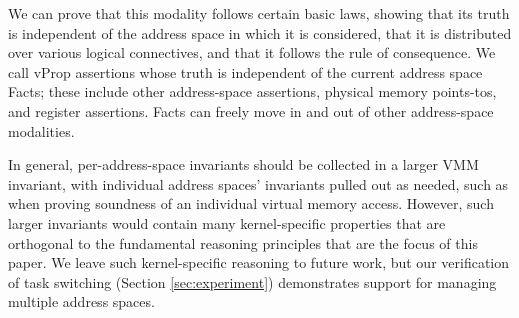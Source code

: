 We can prove that this modality follows certain basic laws, showing that its truth is independent of the address
space in which it is considered, that it is distributed over various logical connectives, and that it follows the rule of
consequence.
We call \textsf{vProp} assertions whose truth is independent of the current address space
\textsf{Fact}s; these include other address-space assertions, physical memory points-tos, and register assertions.
\textsf{Fact}s can freely move in and out of other address-space modalities.

In general, per-address-space invariants should be collected in a larger
VMM invariant, with individual address spaces' invariants pulled out as needed, such as when proving
soundness of an individual virtual memory access.
However, such larger invariants would contain many kernel-specific properties that are orthogonal
to the fundamental reasoning principles that are the focus of this paper.
We leave such kernel-specific reasoning to future work, but our verification of task switching
(Section \ref{sec:experiment}) demonstrates support for managing multiple address spaces.



  



